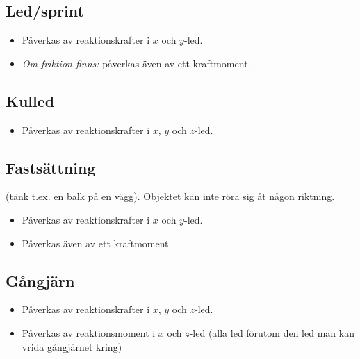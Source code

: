 \documentclass{article}
\newenvironment{ankiflashcard}[1]{}{}
\begin{document}
\begin{paracol}{2}
\begin{ankiflashcard}{Vilka reaktionskrafter påverkas en led/en sprint av}
\subsection{Led/sprint}
\begin{itemize}
    \item Påverkas av reaktionskrafter i $x$ och $y$-led.
    \item \textit{Om friktion finns:} påverkas även av ett kraftmoment.
\end{itemize}
\end{ankiflashcard}

\begin{ankiflashcard}{Vilka reaktionskrafter påverkas en kulled av?}
    
\subsection{Kulled}

\begin{itemize}
    \item Påverkas av reaktionskrafter i $x$, $y$ och $z$-led.
\end{itemize}
\end{ankiflashcard}

\begin{ankiflashcard}{Vilka reaktionskrafter påverkas ett fastsatt objekt av?}
\subsection{Fastsättning}
(tänk t.ex. en balk på en vägg). Objektet kan inte röra sig åt någon riktning.
\begin{itemize}
    \item Påverkas av reaktionskrafter i $x$ och $y$-led.
    \item Påverkas även av ett kraftmoment.
\end{itemize}
\end{ankiflashcard}

\begin{ankiflashcard}{Vilka reaktionskrafter påverkas ett gångjärn av?}
\subsection{Gångjärn}
\begin{itemize}
    \item Påverkas av reaktionskrafter i $x$, $y$ och $z$-led.
    \item Påverkas av reaktionsmoment i $x$ och $z$-led (alla led förutom den led man kan vrida gångjärnet kring)
\end{itemize}
\end{ankiflashcard}


\end{paracol}
\end{document}
